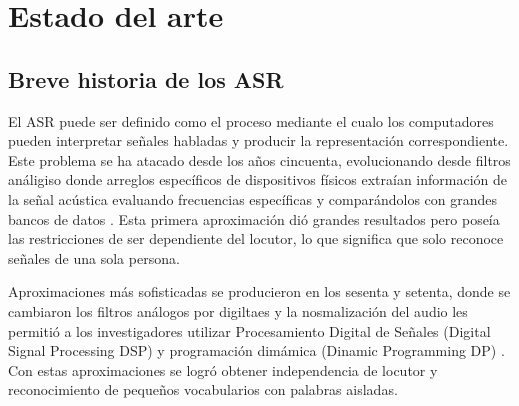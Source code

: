 \chapter{Estado del arte}

\section{Breve historia de los ASR}

El ASR puede ser definido como el proceso mediante el cualo los computadores pueden interpretar señales habladas y producir la representación correspondiente. Este problema se ha atacado desde los años cincuenta, evolucionando desde filtros análigiso donde arreglos específicos de dispositivos físicos extraían información de la señal acústica evaluando frecuencias específicas y comparándolos con grandes bancos de datos \cite{Davis1952AutomaticDigits,Olson1957PhoneticTypewriter}. Esta primera aproximación dió grandes resultados pero poseía las restricciones de ser dependiente del locutor, lo que significa que solo reconoce señales de una sola persona.

Aproximaciones más sofisticadas se producieron en los sesenta y setenta, donde se cambiaron los filtros análogos por digiltaes y la nosmalización del audio les permitió a los investigadores utilizar Procesamiento Digital de Señales (Digital Signal Processing DSP) y programación dimámica (Dinamic Programming DP) \cite{Velichko1970AutomaticWords,Sakoe1978DynamicRecognition,Itakura1975MinimumRecognition}. Con estas aproximaciones se logró obtener independencia de locutor y reconocimiento de pequeños vocabularios con palabras aisladas.


